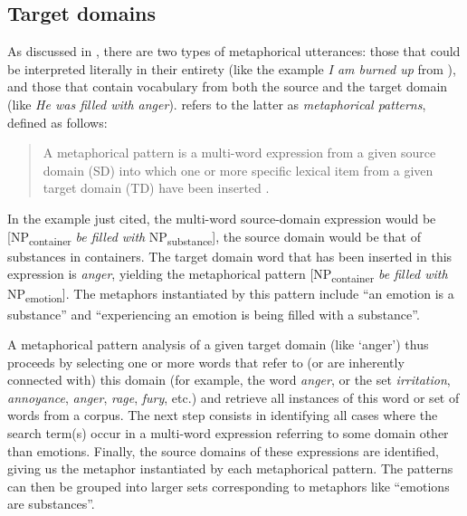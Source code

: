 \subsection{Target domains}\label{sec:targetdomains}

As discussed in , there are two types of metaphorical  utterances: those that could be interpreted literally  in their entirety (like the example \textit{I am burned up} from \citealt[203]{lakoff_cognitive_1987}), and those that contain vocabulary from both the source and the target domain (like \textit{He was filled with anger}).  \citet{stefanowitsch_happiness_2004, stefanowitsch_words_2006} refers to the latter as \textit{metaphorical patterns}, defined as follows:

\vspace{-.5\baselineskip}\begin{quote}
A metaphorical  pattern is a multi\hyp{}word expression from a given source domain (SD) into which one or more specific lexical item from a given target domain (TD) have been inserted \citep[66]{stefanowitsch_words_2006}.
\end{quote}\pagebreak

In the example just cited, the multi\hyp{}word source\hyp{}domain expression would be [NP\textsubscript{container} \textit{be filled with} NP\textsubscript{substance}], the source domain would be that of substances in containers. The target domain word that has been inserted in this expression is \textit{anger},  yielding the metaphorical  pattern [NP\textsubscript{container} \textit{be filled with} NP\textsubscript{emotion}]. The metaphors instantiated by this pattern include ``an emotion is a substance'' and ``experiencing an emotion is being filled with a substance''.

A metaphorical  pattern analysis  of a given target domain (like `anger')  thus proceeds by selecting one or more words that refer to (or are inherently connected with) this domain (for example, the word \textit{anger}, or the set \textit{irritation}, \textit{annoyance}, \textit{anger}, \textit{rage}, \textit{fury}, etc.) and retrieve  all instances of this word or set of words from a corpus. The next step consists in identifying all cases where the search term(s) occur in a multi\hyp{}word expression referring to some domain other than emotions.  Finally, the source domains of these expressions are identified, giving us the metaphor  instantiated by each metaphorical pattern. The patterns can then be grouped into larger sets corresponding to metaphors like ``emotions are substances''.


